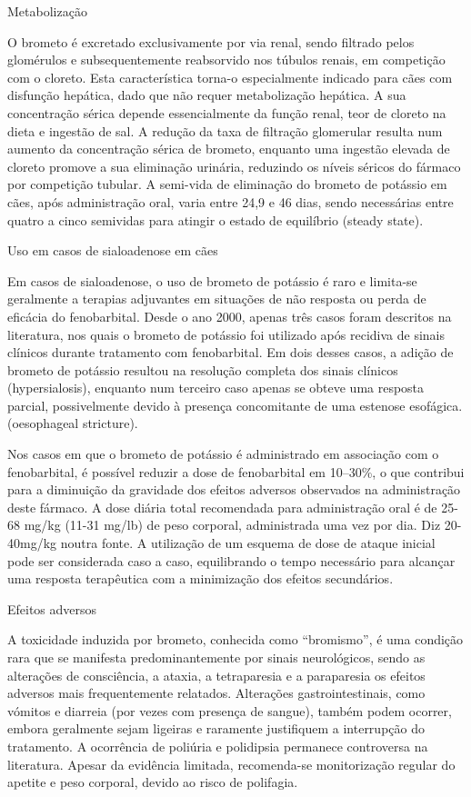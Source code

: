 Metabolização 


O brometo é excretado exclusivamente por via renal, sendo filtrado pelos glomérulos e subsequentemente reabsorvido nos túbulos renais, em competição com o cloreto. \cite{Fantinati2021} Esta característica torna-o especialmente indicado para cães com disfunção hepática, dado que não requer metabolização hepática. A sua concentração sérica depende essencialmente da função renal, teor de cloreto na dieta e ingestão de sal. A redução da taxa de filtração glomerular resulta num aumento da concentração sérica de brometo, enquanto uma ingestão elevada de cloreto promove a sua eliminação urinária, reduzindo os níveis séricos do fármaco por competição tubular. A semi-vida de eliminação do brometo de potássio em cães, após administração oral, varia entre 24,9 e 46 dias, sendo necessárias entre quatro a cinco semividas para atingir o estado de equilíbrio (steady state).


Uso em casos de sialoadenose em cães


Em casos de sialoadenose, o uso de brometo de potássio é raro e limita-se geralmente a terapias adjuvantes em situações de não resposta ou perda de eficácia do fenobarbital. Desde o ano 2000, apenas três casos foram descritos na literatura, nos quais o brometo de potássio foi utilizado após recidiva de sinais clínicos durante tratamento com fenobarbital. Em dois desses casos, a adição de brometo de potássio resultou na resolução completa dos sinais clínicos (hypersialosis), enquanto num terceiro caso apenas se obteve uma resposta parcial, possivelmente devido à presença concomitante de uma estenose esofágica. (oesophageal stricture). 


Nos casos em que o brometo de potássio é administrado em associação com o fenobarbital, é possível reduzir a dose de fenobarbital em 10–30\%, o que contribui para a diminuição da gravidade dos efeitos adversos observados na administração deste fármaco. \cite{Gouveia2024} A dose diária total recomendada para administração oral é de 25-68 mg/kg (11-31 mg/lb) de peso corporal, administrada uma vez por dia. \cite{Fda2021} Diz 20-40mg/kg noutra fonte. A utilização de um esquema de dose de ataque inicial pode ser considerada caso a caso, equilibrando o tempo necessário para alcançar uma resposta terapêutica com a minimização dos efeitos secundários. \cite{Fda2021}


Efeitos adversos


A toxicidade induzida por brometo, conhecida como “bromismo”, é uma condição rara que se manifesta predominantemente por sinais neurológicos, sendo as alterações de consciência, a ataxia, a tetraparesia e a paraparesia os efeitos adversos mais frequentemente relatados. \cite{Fantinati2021} Alterações gastrointestinais, como vómitos e diarreia (por vezes com presença de sangue), também podem ocorrer, embora geralmente sejam ligeiras e raramente justifiquem a interrupção do tratamento. A ocorrência de poliúria e polidipsia permanece controversa na literatura. Apesar da evidência limitada, recomenda-se monitorização regular do apetite e peso corporal, devido ao risco de polifagia.


